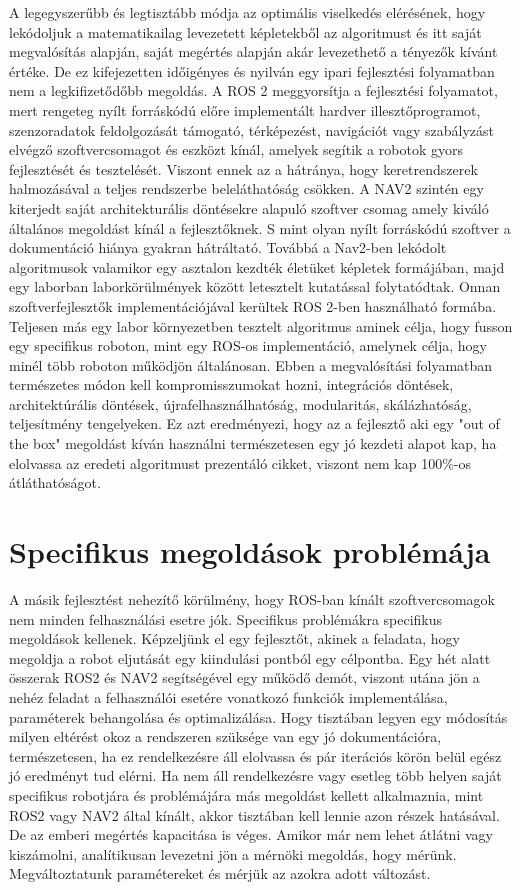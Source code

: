 A legegyszerűbb és legtisztább módja az optimális viselkedés elérésének, hogy lekódoljuk a matematikailag levezetett képletekből az algoritmust és itt saját megvalósítás alapján, saját megértés alapján akár levezethető a tényezők kívánt értéke. De ez kifejezetten időigényes és nyilván egy ipari fejlesztési folyamatban nem a legkifizetődőbb megoldás. A ROS 2 meggyorsítja a fejlesztési folyamatot, mert rengeteg nyílt forráskódú előre implementált hardver illesztőprogramot, szenzoradatok feldolgozását támogató, térképezést, navigációt vagy szabályzást elvégző szoftvercsomagot és eszközt kínál, amelyek segítik a robotok gyors fejlesztését és tesztelését. Viszont ennek az a hátránya, hogy keretrendszerek halmozásával a teljes rendszerbe beleláthatóság csökken. A NAV2 szintén egy kiterjedt saját architekturális döntésekre alapuló szoftver csomag amely kiváló általános megoldást kínál a fejlesztőknek. S mint olyan nyílt forráskódú szoftver a dokumentáció hiánya gyakran hátráltató. Továbbá a Nav2-ben lekódolt algoritmusok valamikor egy asztalon kezdték életüket képletek formájában, majd egy laborban laborkörülmények között letesztelt kutatással folytatódtak. Onnan szoftverfejlesztők implementációjával kerültek ROS 2-ben használható formába. Teljesen más egy labor környezetben tesztelt algoritmus aminek célja, hogy fusson egy specifikus roboton, mint egy ROS-os implementáció, amelynek célja, hogy minél több roboton működjön általánosan. Ebben a megvalósítási folyamatban természetes módon kell kompromisszumokat hozni, integrációs döntések, architektúrális döntések, újrafelhasználhatóság, modularitás, skálázhatóság, teljesítmény tengelyeken. Ez azt eredményezi, hogy az a fejlesztő aki egy "out of the box" megoldást kíván használni természetesen egy jó kezdeti alapot kap, ha elolvassa az eredeti algoritmust prezentáló cikket, viszont nem kap 100\%-os átláthatóságot.

\section{Specifikus megoldások problémája}
A másik fejlesztést nehezítő körülmény, hogy ROS-ban kínált szoftvercsomagok nem minden felhasználási esetre jók. Specifikus problémákra specifikus megoldások kellenek. Képzeljünk el egy fejlesztőt, akinek a feladata, hogy megoldja a robot eljutását egy kiindulási pontból egy célpontba. Egy hét alatt összerak ROS2 és NAV2 segítségével egy működő demót, viszont utána jön a nehéz feladat a felhasználói esetére vonatkozó funkciók implementálása, paraméterek behangolása és optimalizálása. Hogy tisztában legyen egy módosítás milyen eltérést okoz a rendszeren szüksége van egy jó dokumentációra, természetesen, ha ez rendelkezésre áll elolvassa és pár iterációs körön belül egész jó eredményt tud elérni. Ha nem áll rendelkezésre vagy esetleg több helyen saját specifikus robotjára és problémájára más megoldást kellett alkalmaznia, mint ROS2 vagy NAV2 által kínált, akkor tisztában kell lennie azon részek hatásával. De az emberi megértés kapacitása is véges. Amikor már nem lehet átlátni vagy kiszámolni, analítikusan levezetni jön a mérnöki megoldás, hogy mérünk. Megváltoztatunk paramétereket és mérjük az azokra adott változást.

